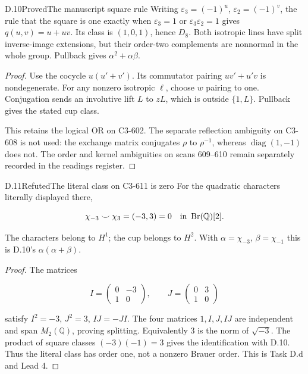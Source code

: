 \begin{statement}{D.10}{Proved}{The manuscript square rule}
Writing $\varepsilon_3=(-1)^u$, $\varepsilon_2=(-1)^v$,
the rule that the square is one exactly when
$\varepsilon_3=1$ or $\varepsilon_3\varepsilon_2=1$
gives $q(u,v)=u+uv$. Its class is $(1,0,1)$, hence $D_8$.
Both isotropic lines have split inverse-image extensions,
but their order-two complements are nonnormal in the
whole group. Pullback gives $\alpha^2+\alpha\beta$.
\end{statement}
\begin{proof}
Use the cocycle $u(u'+v')$.
Its commutator pairing $uv'+u'v$ is nondegenerate.
For any nonzero isotropic $\ell$, choose $w$ pairing to one.
Conjugation sends an involutive lift $L$ to $zL$,
which is outside $\{1,L\}$. Pullback gives the stated cup class.

This retains the logical OR on C3-602.
The separate reflection ambiguity on C3-608 is not used:
the exchange matrix conjugates $\rho$ to $\rho^{-1}$,
whereas $\operatorname{diag}(1,-1)$ does not.
The order and kernel ambiguities on scans 609--610
remain separately recorded in the readings register.
\end{proof}

\begin{statement}{D.11}{Refuted}{The literal class on C3-611 is zero}
For the quadratic characters literally displayed there,

$$
\chi_{-3}\smile\chi_3=(-3,3)=0
       \quad\hbox{in }\operatorname{Br}(\mathbb Q)[2].
$$

The characters belong to $H^1$; the cup belongs to $H^2$.
With $\alpha=\chi_{-3}$, $\beta=\chi_{-1}$ this is
D.10's $\alpha(\alpha+\beta)$.
\end{statement}
\begin{proof}
The matrices

$$
I=\begin{pmatrix}0&-3\\1&0\end{pmatrix},\qquad
 J=\begin{pmatrix}0&3\\1&0\end{pmatrix}
$$

satisfy $I^2=-3$, $J^2=3$, $IJ=-JI$.
The four matrices $1,I,J,IJ$ are independent and span
$M_2(\mathbb Q)$, proving splitting.
Equivalently $3$ is the norm of $\sqrt{-3}$.
The product of square classes $(-3)(-1)=3$ gives
the identification with D.10.
Thus the literal class has order one, not a nonzero
Brauer order. This is Task D.d and Lead 4.
\end{proof}

